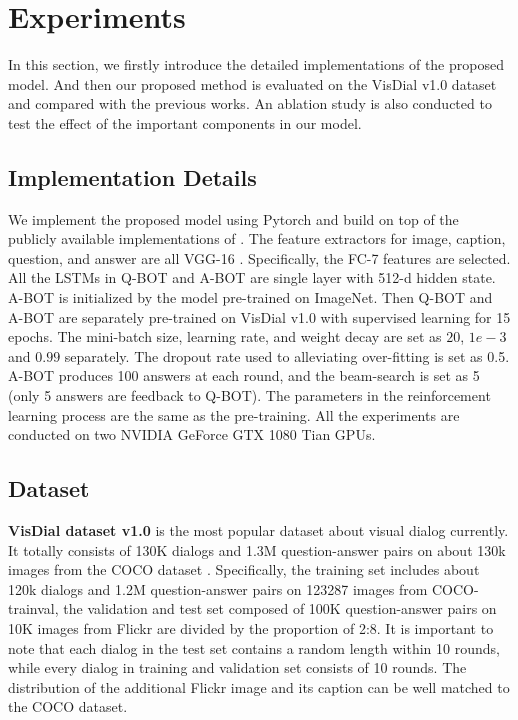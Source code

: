 \documentclass[review]{elsarticle}
\begin{document}
	\section{Experiments}
	In this section, we firstly introduce the detailed implementations of the proposed model. And then our proposed method is evaluated on the VisDial v1.0 dataset and compared with the previous works. An ablation study is also conducted to test the effect of the important components in our model. 
	\subsection{Implementation Details} 
	We implement the proposed model using Pytorch and build on top of the publicly available implementations of \cite{DBLP:conf/iccv/DasKMLB17}. 
	The feature extractors for image, caption, question, and answer are all VGG-16 \cite{DBLP:journals/corr/SimonyanZ14a}. Specifically, the FC-7 features are selected. 
	All the LSTMs in Q-BOT and A-BOT are single layer with 512-d hidden state. A-BOT is initialized by the model pre-trained on ImageNet. 
	Then Q-BOT and A-BOT are separately pre-trained on VisDial v1.0 with supervised learning for 15 epochs. The mini-batch size, learning rate, and weight decay are set as $20$, $1e-3$ and $0.99$ separately. The dropout rate used to alleviating over-fitting is set as 0.5. 
	A-BOT produces 100 answers at each round, and the beam-search is set as 5 (only 5 answers are feedback to Q-BOT). The parameters in the reinforcement learning process are the same as the pre-training. All the experiments are conducted on two NVIDIA GeForce GTX 1080 Tian GPUs. 
	
	\subsection{Dataset}
	\textbf{VisDial dataset v1.0} is the most popular dataset about visual dialog currently. It totally consists of 130K dialogs and 1.3M question-answer pairs on about 130k images from the COCO dataset \cite{DBLP:conf/eccv/LinMBHPRDZ14}. 
	Specifically, the training set includes about 120k dialogs and 1.2M question-answer pairs on 123287 images from COCO-trainval, the validation and test set composed of 100K question-answer pairs on 10K images from Flickr are divided by the proportion of 2:8. 
	It is important to note that each dialog in the test set contains a random length within 10 rounds, while every dialog in training and validation set consists of 10 rounds. The distribution of the additional Flickr image and its caption can be well matched to the COCO dataset. 
	
\end{document}
